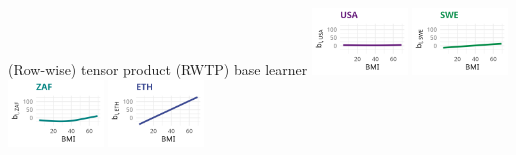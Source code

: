 \documentclass[t,10pt]{beamer}
\begin{document}
\begin{frame}{(Row-wise) tensor product (RWTP) base learner}
  {\includegraphics[width=0.19\textwidth]{figures/bs-tensor/fig-tensor-USA.png}}
  \includegraphics[width=0.19\textwidth]{figures/bs-tensor/fig-tensor-SWE.png}
  {\includegraphics[width=0.19\textwidth]{figures/bs-tensor/fig-tensor-ZAF.png}}
  {\includegraphics[width=0.19\textwidth]{figures/bs-tensor/fig-tensor-ETH.png}}
  \addtocounter{framenumber}{-1}
\end{frame}
\end{document}
